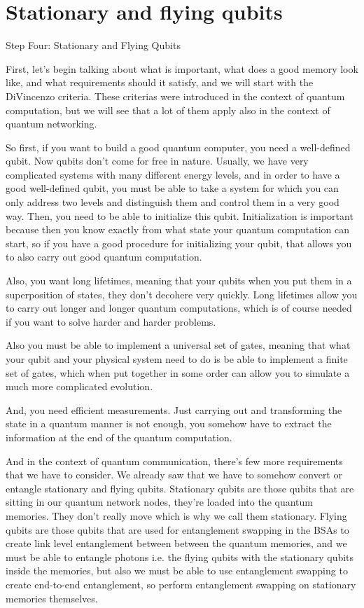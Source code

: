 \section{Stationary and flying qubits}

Step Four: Stationary and Flying Qubits

First, let's begin talking about what is important, what does a good memory look like, and what requirements should it satisfy, and we will start with the DiVincenzo criteria. These criterias were introduced in the context of quantum computation, but we will see that a lot of them apply also in the context of quantum networking.

So first, if you want to build a good quantum computer, you need a well-defined qubit. Now qubits don't come for free in nature. Usually, we have very complicated systems with many different energy levels, and in order to have a good well-defined qubit, you must be able to take a system for which you can only address two levels and distinguish them and control them in a very good way. Then, you need to be able to initialize this qubit. Initialization is important because then you know exactly from what state your quantum computation can start, so if you have a good procedure for initializing your qubit, that allows you to also carry out good quantum computation.

Also, you want long lifetimes, meaning that your qubits when you put them in a superposition of states, they don't decohere very quickly. Long lifetimes allow you to carry out longer and longer quantum computations, which is of course needed if you want to solve harder and harder problems.

Also you must be able to implement a universal set of gates, meaning that what your qubit and your physical system need to do is be able to implement a finite set of gates, which when put together in some order can allow you to simulate a much more complicated evolution.

And, you need efficient measurements. Just carrying out and transforming the state in a quantum manner is not enough, you somehow have to extract the information at the end of the quantum computation.

And in the context of quantum communication, there's few more requirements that we have to consider. We already saw that we have to somehow convert or entangle stationary and flying qubits. Stationary qubits are those qubits that are sitting in our quantum network nodes, they're loaded into the quantum memories. They don't really move which is why we call them stationary. Flying qubits are those qubits that are used for entanglement swapping in the BSAs to create link level entanglement between between the quantum memories, and we must be able to entangle photons i.e. the flying qubits with the stationary qubits inside the memories, but also we must be able to use entanglement swapping to create end-to-end entanglement, so perform entanglement swapping on stationary memories themselves.

